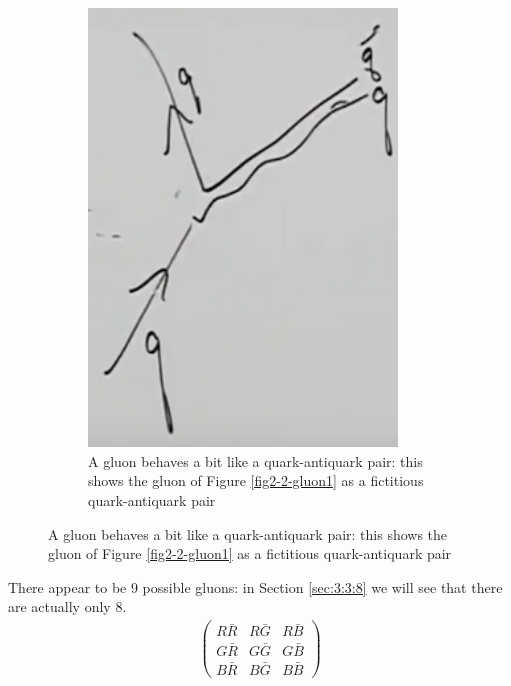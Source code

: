 \documentclass[]{article}
\begin{document}
\begin{figure}[H]
\begin{subfigure}[t]{0.45\textwidth}
		\caption{A gluon behaves a bit like a quark-antiquark pair: this shows the gluon of Figure \ref{fig2-2-gluon1} as a fictitious quark-antiquark pair}
		\includegraphics[width=0.9\textwidth]{2-2-gluon2}
	\end{subfigure}

\end{figure}

There appear to be 9 possible gluons: in Section \ref{sec:3:3:8} we will see that there are actually only 8.
\begin{align*}
\begin{pmatrix}
R\bar{R}&R\bar{G}&R\bar{B}\\
G\bar{R}&G\bar{G}&G\bar{B}\\
B\bar{R}&B\bar{G}&B\bar{B}
\end{pmatrix}
\end{align*}
\end{document}
